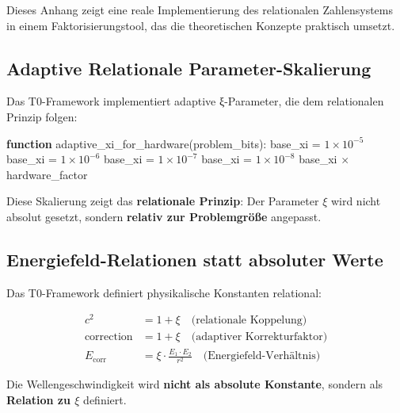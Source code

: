 	Dieses Anhang zeigt eine reale Implementierung des relationalen Zahlensystems in einem Faktorisierungstool, das die theoretischen Konzepte praktisch umsetzt.
	
	\subsection{Adaptive Relationale Parameter-Skalierung}
	
	Das T0-Framework implementiert adaptive ξ-Parameter, die dem relationalen Prinzip folgen:
	
	\begin{algorithm}[H]
\scriptsize
		\caption{Adaptive $\xi$-Parameter im relationalen System}
		\label{alg:adaptive_xi}
		\begin{algorithmic}[1]
			\STATE \textbf{function} adaptive\_xi\_for\_hardware(problem\_bits):
			\STATE base\_xi = $1 \times 10^{-5}$ 
			\STATE base\_xi = $1 \times 10^{-6}$ 
			\STATE base\_xi = $1 \times 10^{-7}$ 
			\ELSE
			\STATE base\_xi = $1 \times 10^{-8}$ 
			\ENDIF
			\RETURN base\_xi $\times$ hardware\_factor
		\end{algorithmic}
	\end{algorithm}
	
	Diese Skalierung zeigt das \textbf{relationale Prinzip}: Der Parameter $\xi$ wird nicht absolut gesetzt, sondern \textbf{relativ zur Problemgröße} angepasst.
	
	\subsection{Energiefeld-Relationen statt absoluter Werte}
	
	Das T0-Framework definiert physikalische Konstanten relational:
	
	\begin{align}
		c^2 &= 1 + \xi \quad \text{(relationale Koppelung)} \\
		\text{correction} &= 1 + \xi \quad \text{(adaptiver Korrekturfaktor)} \\
		E_{\text{corr}} &= \xi \cdot \frac{E_1 \cdot E_2}{r^2} \quad \text{(Energiefeld-Verhältnis)}
	\end{align}
	
	Die Wellengeschwindigkeit wird \textbf{nicht als absolute Konstante}, sondern als \textbf{Relation zu $\xi$} definiert.
	
